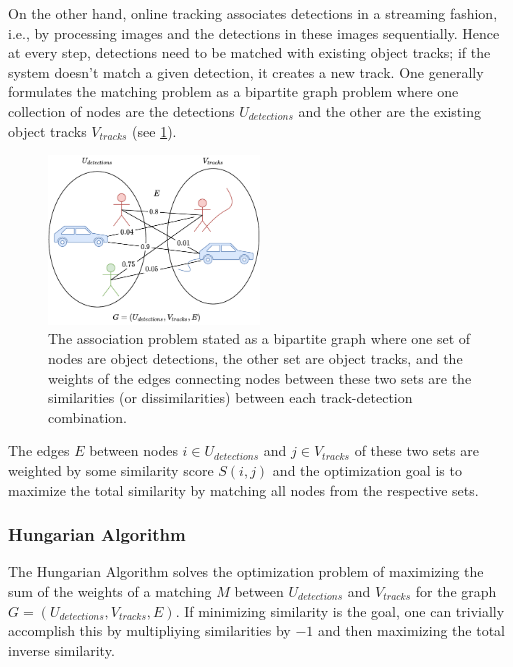 \documentclass[headsepline, hidelinks, footsepline, footinclude=false, oneside, fontsize=11pt, paper=a4, listof=totoc, bibliography=totoc]{scrbook}
\begin{document}
On the other hand, online tracking associates detections in a streaming fashion, i.e., by processing images and the detections in these images sequentially. Hence at every step, detections need to be matched with
existing object tracks; if the system doesn't match a given detection, it creates a new track. 
One generally formulates the matching problem as a bipartite graph problem where one collection of nodes are the detections \(U_{detections}\) 
and the other are the existing object tracks \(V_{tracks}\) (see \cref{fig:bipartite-graph}). 

\begin{figure}[htbp]
\centering
\includegraphics[width=0.5\textwidth]{figures/bipartite-graph.pdf}
\caption{\label{fig:bipartite-graph}The association problem stated as a bipartite graph where one set of nodes are object detections, the other set are object tracks, and the weights of the edges connecting nodes between these two sets are the similarities (or dissimilarities) between each track-detection combination.}
\end{figure}

The edges \(E\) between nodes \(i \in U_{detections}\) and \(j \in V_{tracks}\) of these two sets are weighted by some similarity score \(S(i, j)\) and the optimization goal is to maximize the total similarity by matching all nodes from the respective sets.

\subsubsection{Hungarian Algorithm}
\label{sec:org0b5702f}
    The Hungarian Algorithm \cite{kuhnHungarianMethodAssignment1955} solves the optimization problem of maximizing the sum of the weights of a matching \(M\) between \(U_{detections}\) and \(V_{tracks}\) for the graph \(G =(U_{detections}, V_{tracks}, E)\).
If minimizing similarity is the goal, one can trivially accomplish this by multipliying similarities by \(-1\) and then maximizing the total inverse similarity.
\end{document}
